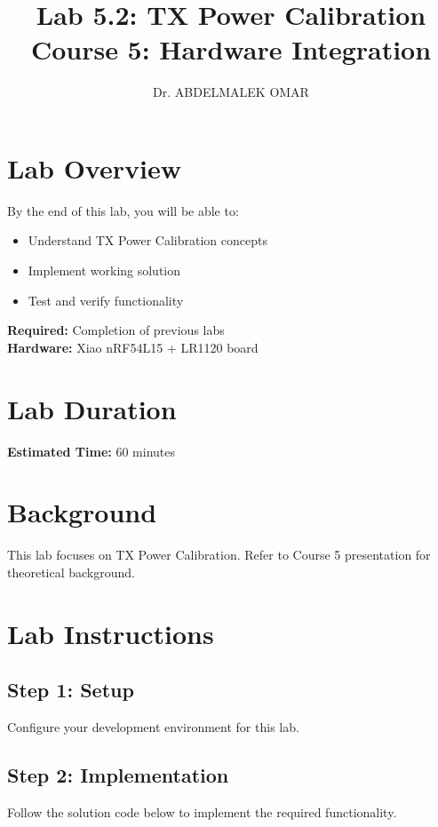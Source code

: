 \documentclass[11pt,a4paper]{article}
\title{\textbf{Lab 5.2: TX Power Calibration}\\
\large Course 5: Hardware Integration}
\author{Dr. ABDELMALEK OMAR}
\date{}
\begin{document}
\maketitle
\thispagestyle{fancy}

\section{Lab Overview}

\begin{objectivebox}
By the end of this lab, you will be able to:
\begin{itemize}
    \item Understand TX Power Calibration concepts
    \item Implement working solution
    \item Test and verify functionality
\end{itemize}
\end{objectivebox}

\begin{prereqbox}
\textbf{Required:} Completion of previous labs\\
\textbf{Hardware:} Xiao nRF54L15 + LR1120 board
\end{prereqbox}

\section{Lab Duration}
\textbf{Estimated Time:} 60 minutes

\section{Background}

This lab focuses on TX Power Calibration. Refer to Course 5 presentation for theoretical background.

\section{Lab Instructions}

\subsection{Step 1: Setup}
Configure your development environment for this lab.

\subsection{Step 2: Implementation}
Follow the solution code below to implement the required functionality.
\end{document}
